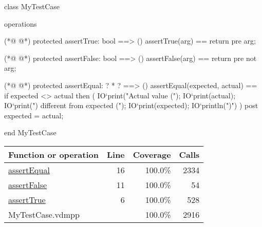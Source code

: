 \begin{vdmpp}[breaklines=true]
class MyTestCase

operations


(*@
\label{assertTrue:6}
@*)
 protected assertTrue: bool ==> ()
 assertTrue(arg) == 
  return 
 pre arg;
  
(*@
\label{assertFalse:11}
@*)
 protected assertFalse: bool ==> ()
 assertFalse(arg) == 
  return 
 pre not arg;
 
(*@
\label{assertEqual:16}
@*)
 protected assertEqual: ? * ? ==> ()
 assertEqual(expected, actual) == 
  if expected <> actual then (
     IO`print("Actual value (");
     IO`print(actual); 
     IO`print(") different from expected (");
     IO`print(expected);
     IO`println(")\n")
  )
 post expected = actual;

end MyTestCase
\end{vdmpp}
\bigskip
\begin{longtable}{|l|r|r|r|}
\hline
Function or operation & Line & Coverage & Calls \\
\hline
\hline
\hyperref[assertEqual:16]{assertEqual} & 16&100.0\% & 2334 \\
\hline
\hyperref[assertFalse:11]{assertFalse} & 11&100.0\% & 54 \\
\hline
\hyperref[assertTrue:6]{assertTrue} & 6&100.0\% & 528 \\
\hline
\hline
MyTestCase.vdmpp & & 100.0\% & 2916 \\
\hline
\end{longtable}

